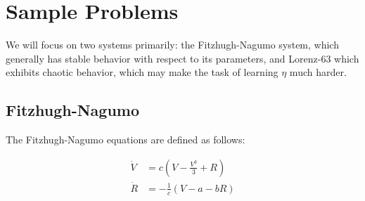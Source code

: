 \documentclass[12pt]{article}
\begin{document}









\section{Sample Problems}\label{examples}

We will focus on two systems primarily: the Fitzhugh-Nagumo system, which generally has stable behavior with respect to its parameters, and Lorenz-63 which exhibits chaotic behavior, which may make the task of learning $\eta$ much harder.


\subsection{Fitzhugh-Nagumo}

The Fitzhugh-Nagumo equations are defined as follows:

\begin{align*}
  \dot{V} &= c \left(V - \frac{V^3}{3} + R \right)\\
  \dot{R} &= -\frac{1}{c} \left( V - a - b R \right)
\end{align*}
\end{document}
